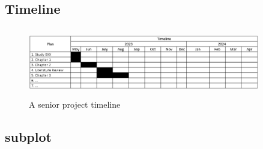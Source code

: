 \documentclass[a4paper]{article}
\begin{document}
\subsection{Timeline}
\begin{figure}[h]
	\centering
	\includegraphics[width=0.9\textwidth, height=3cm]{timeline}
	\caption{A senior project timeline}
	\label{fig:timeline}
\end{figure}

\subsection{subplot}
\end{document}
